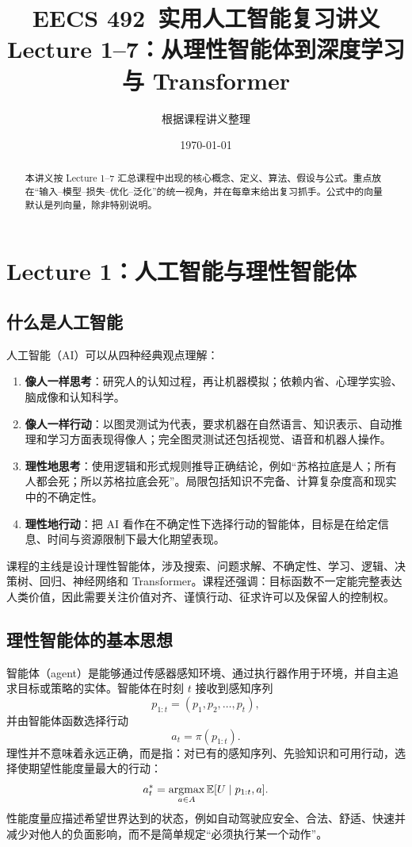 \documentclass[UTF8,11pt,a4paper]{ctexart}
\title{EECS 492\ 实用人工智能复习讲义\\\large Lecture 1--7：从理性智能体到深度学习与 Transformer}
\author{根据课程讲义整理}
\date{\today}
\begin{document}
\maketitle
\begin{abstract}
本讲义按 Lecture 1--7 汇总课程中出现的核心概念、定义、算法、假设与公式。重点放在“输入--模型--损失--优化--泛化”的统一视角，并在每章末给出复习抓手。公式中的向量默认是列向量，除非特别说明。
\end{abstract}
\tableofcontents
\newpage

\section{Lecture 1：人工智能与理性智能体}
\subsection{什么是人工智能}
人工智能（AI）可以从四种经典观点理解：\begin{enumerate}
\item \textbf{像人一样思考}：研究人的认知过程，再让机器模拟；依赖内省、心理学实验、脑成像和认知科学。
\item \textbf{像人一样行动}：以图灵测试为代表，要求机器在自然语言、知识表示、自动推理和学习方面表现得像人；完全图灵测试还包括视觉、语音和机器人操作。
\item \textbf{理性地思考}：使用逻辑和形式规则推导正确结论，例如“苏格拉底是人；所有人都会死；所以苏格拉底会死”。局限包括知识不完备、计算复杂度高和现实中的不确定性。
\item \textbf{理性地行动}：把 AI 看作在不确定性下选择行动的智能体，目标是在给定信息、时间与资源限制下最大化期望表现。
\end{enumerate}

课程的主线是设计理性智能体，涉及搜索、问题求解、不确定性、学习、逻辑、决策树、回归、神经网络和 Transformer。课程还强调：目标函数不一定能完整表达人类价值，因此需要关注价值对齐、谨慎行动、征求许可以及保留人的控制权。

\subsection{理性智能体的基本思想}
智能体（agent）是能够通过传感器感知环境、通过执行器作用于环境，并自主追求目标或策略的实体。智能体在时刻 $t$ 接收到感知序列
\[
 p_{1:t}=(p_1,p_2,\ldots,p_t),
\]
并由智能体函数选择行动
\[
 a_t=\pi(p_{1:t}).
\]
理性并不意味着永远正确，而是指：对已有的感知序列、先验知识和可用行动，选择使期望性能度量最大的行动：
\[
 a_t^*=\mathop{\mathrm{argmax}}_{a\in A}\mathbb{E}[U\mid p_{1:t},a].
\]
性能度量应描述希望世界达到的状态，例如自动驾驶应安全、合法、舒适、快速并减少对他人的负面影响，而不是简单规定“必须执行某一个动作”。
\end{document}
